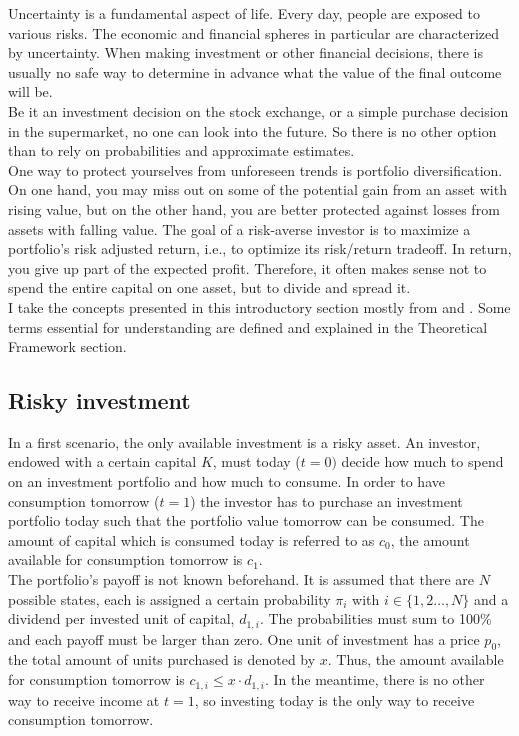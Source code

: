 Uncertainty is a fundamental aspect of life. Every day, people are exposed to various risks. The economic and financial spheres in particular are characterized by uncertainty. When making investment or other financial decisions, there is usually no safe way to determine in advance what the value of the final outcome will be. \\
Be it an investment decision on the stock exchange, or a simple purchase decision in the supermarket, no one can look into the future. So there is no other option than to rely on probabilities and approximate estimates.\\

\noindent One way to protect yourselves from unforeseen trends is portfolio diversification. On one hand, you may miss out on some of the potential gain from an asset with rising value, but on the other hand, you are better protected against losses from assets with falling value. The goal of a risk-averse investor is to maximize a portfolio’s risk adjusted return, i.e., to optimize its risk/return tradeoff. In return, you give up part of the expected profit. Therefore, it often makes sense not to spend the entire capital on one asset, but to divide and spread it.\\

\noindent I take the concepts presented in this introductory section mostly from \citep{varian2010intermediate} and \citep{ingersoll1987theory}. Some terms essential for understanding are defined and explained in the Theoretical Framework section.

\bigskip

\subsection{Risky investment}

\noindent In a first scenario, the only available investment is a risky asset. An investor, endowed with a certain capital $K$, must today ($t=0)$ decide how much to spend on an investment portfolio and how much to consume. In order to have consumption tomorrow ($t=1$) the investor has to purchase an investment portfolio today such that the portfolio value tomorrow can be consumed. The amount of capital which is consumed today is referred to as $c_0$, the amount available for consumption tomorrow is $c_{1}$.\\
The portfolio's payoff is not known beforehand. It is assumed that there are $N$ possible states, each is assigned a certain probability $\pi_i$ with $i\in\{1,2\dots,N\}$ and a dividend per invested unit of capital, $d_{1,i}$. The probabilities must sum to 100\% and each payoff must be larger than zero. One unit of investment has a price $p_0$, the total amount of units purchased is denoted by $x$. Thus, the amount available for consumption tomorrow is $c_{1,i} \leq x \cdot d_{1,i}$. In the meantime, there is no other way to receive income at $t=1$, so investing today is the only way to receive consumption tomorrow.\\


